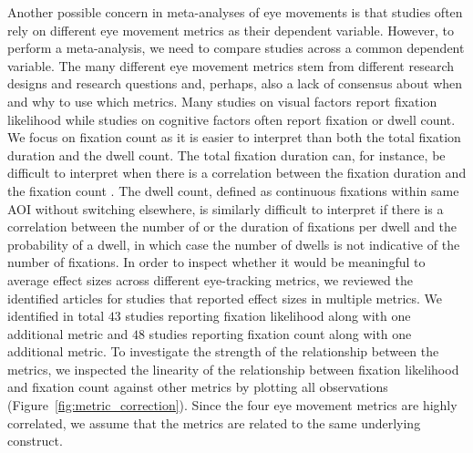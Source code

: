 Another possible concern in meta-analyses of eye movements is that studies often rely on different eye movement metrics as their dependent variable. However, to perform a meta-analysis, we need to compare studies across a common dependent variable. The many different eye movement metrics stem from different research designs and research questions and, perhaps, also a lack of consensus about when and why to use which metrics. Many studies on visual factors report fixation likelihood while studies on cognitive factors often report fixation or dwell count. We focus on fixation count as it is easier to interpret than both the total fixation duration and the dwell count. The total fixation duration can, for instance, be difficult to interpret when there is a correlation between the fixation duration and the fixation count \citep{orquin2018a}. The dwell count, defined as continuous fixations within same AOI without switching elsewhere, is similarly difficult to interpret if there is a correlation between the number of or the duration of fixations per dwell and the probability of a dwell, in which case the number of dwells is not indicative of the number of fixations. In order to inspect whether it would be meaningful to average effect sizes across different eye-tracking metrics, we reviewed the identified articles for studies that reported effect sizes in multiple metrics. We identified in total $43$ studies reporting fixation likelihood along with one additional metric and $48$ studies reporting fixation count along with one additional metric. To investigate the strength of the relationship between the metrics, we inspected the linearity of the relationship between fixation likelihood and fixation count against other metrics by plotting all observations (Figure~\ref{fig:metric_correction}). Since the four eye movement metrics are highly correlated, we assume that the metrics are related to the same underlying construct.\\ 
